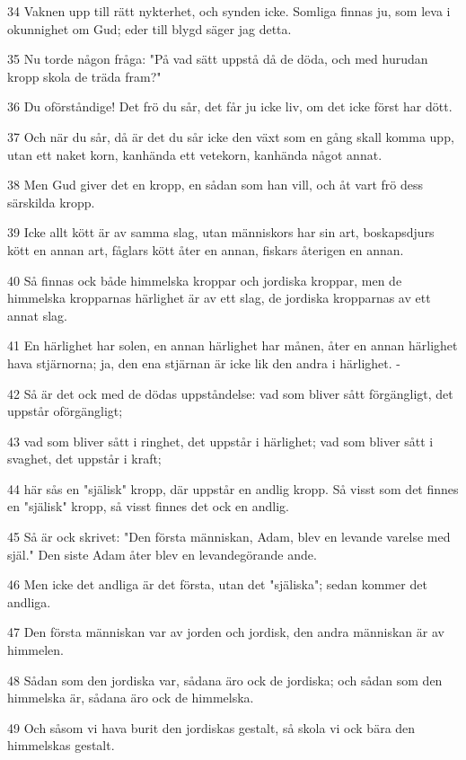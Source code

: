 \par 34 Vaknen upp till rätt nykterhet, och synden icke. Somliga finnas ju, som leva i okunnighet om Gud; eder till blygd säger jag detta.
\par 35 Nu torde någon fråga: "På vad sätt uppstå då de döda, och med hurudan kropp skola de träda fram?"
\par 36 Du oförståndige! Det frö du sår, det får ju icke liv, om det icke först har dött.
\par 37 Och när du sår, då är det du sår icke den växt som en gång skall komma upp, utan ett naket korn, kanhända ett vetekorn, kanhända något annat.
\par 38 Men Gud giver det en kropp, en sådan som han vill, och åt vart frö dess särskilda kropp.
\par 39 Icke allt kött är av samma slag, utan människors har sin art, boskapsdjurs kött en annan art, fåglars kött åter en annan, fiskars återigen en annan.
\par 40 Så finnas ock både himmelska kroppar och jordiska kroppar, men de himmelska kropparnas härlighet är av ett slag, de jordiska kropparnas av ett annat slag.
\par 41 En härlighet har solen, en annan härlighet har månen, åter en annan härlighet hava stjärnorna; ja, den ena stjärnan är icke lik den andra i härlighet. -
\par 42 Så är det ock med de dödas uppståndelse: vad som bliver sått förgängligt, det uppstår oförgängligt;
\par 43 vad som bliver sått i ringhet, det uppstår i härlighet; vad som bliver sått i svaghet, det uppstår i kraft;
\par 44 här sås en "själisk" kropp, där uppstår en andlig kropp. Så visst som det finnes en "själisk" kropp, så visst finnes det ock en andlig.
\par 45 Så är ock skrivet: "Den första människan, Adam, blev en levande varelse med själ." Den siste Adam åter blev en levandegörande ande.
\par 46 Men icke det andliga är det första, utan det "själiska"; sedan kommer det andliga.
\par 47 Den första människan var av jorden och jordisk, den andra människan är av himmelen.
\par 48 Sådan som den jordiska var, sådana äro ock de jordiska; och sådan som den himmelska är, sådana äro ock de himmelska.
\par 49 Och såsom vi hava burit den jordiskas gestalt, så skola vi ock bära den himmelskas gestalt.
